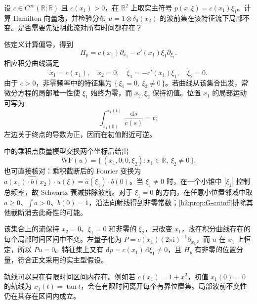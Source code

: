 \begin{exercise}\label{b2:ex:app-G-6}
设 \(c\in C^\infty(\mathbb R;\mathbb R)\) 且 \(c(x_1)>0\)，在 \(\mathbb R^2\) 上取实主符号
\(p(x,\xi)=c(x_1)\xi_1\)。计算 Hamilton 向量场，并检验分布
\(u=1\otimes\delta_0(x_2)\) 的波前集在该特征流下局部不变。是否需要先证明此流对所有时间都存在？
\end{exercise}
\begin{solution}
依定义计算偏导，得到
\[
 H_p=c(x_1)\partial_{x_1}
       -c'(x_1)\xi_1\partial_{\xi_1}.
\]
相应积分曲线满足
\[
 \dot x_1=c(x_1),\quad\dot x_2=0,
 \quad\dot\xi_1=-c'(x_1)\xi_1,\quad\dot\xi_2=0.
\]
由于 \(c>0\)，非零频率中的特征集为
\(\{\,\xi_1=0,\ \xi_2\ne0\,\}\)。若曲线从该集合出发，常微分方程的局部唯一性使 \(\xi_1\) 始终为零，而 \(x_2,\xi_2\) 保持初值。位置 \(x_1\) 的局部运动可写为
\[
 \int_{x_1(0)}^{x_1(t)}\frac{\mathrm ds}{c(s)}=t;
\]
左边关于终点的导数为正，因而在初值附近可逆。

中的乘积点质量模型交换两个坐标后给出
\[
 \mathrm{WF}(u)
 =\{\,(x_1,0;0,\xi_2):x_1\in\mathbb R,\ \xi_2\ne0\,\}.
\]
也可直接核对：乘积截断后的 Fourier 变换为
\(\widehat{a(x_1)\cdot b(x_2)\cdot u}(\xi)=\widehat a(\xi_1)\cdot b(0)\)。当 \(\xi_1\ne0\) 时，在一个小锥中 \(|\xi_1|\) 控制总频率，故 Schwartz 衰减排除波前。对于 \(\xi_1=0\) 的方向，在任意小位置邻域中取 \(a\ge0\)、\(\int a>0\)、\(b(0)=1\)，沿法向射线得到非零常数；\cref{b2:prop:G-cutoff}排除其他截断消去此奇性的可能。

该集合上的流保持 \(x_2=0\)、\(\xi_1=0\) 和非零的 \(\xi_2\)，只改变 \(x_1\)，故在积分曲线存在的每个局部时间区间中不变。左量子化为
\(P=c(x_1)(2\pi\mathrm i)^{-1}\partial_{x_1}\)，而 \(u\) 在 \(x_1\) 上恒定，所以 \(Pu=0\)。特征集上又有 \(\mathrm dp=c(x_1)\,\mathrm d\xi_1\ne0\)，且 \(H_p\) 有非零的位置分量，符合正文采用的实主型假设。

轨线可以只在有限时间区间内存在。例如若 \(c(x_1)=1+x_1^2\)，初值 \(x_1(0)=0\) 的轨线为 \(x_1(t)=\tan t\)，会在有限时间离开每个有界位置集。局部波前不变性仍在其存在区间内成立。
\end{solution}

